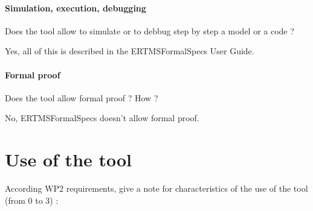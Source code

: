 \paragraph{Simulation, execution, debugging}
Does the tool allow to simulate or to debbug step by step a model or a code ?

\begin{author_comment}
Yes, all of this is described in the ERTMSFormalSpecs User Guide.
\end{author_comment}

\paragraph{Formal proof}
Does the tool allow formal proof ?  How ?

\begin{author_comment}
No, ERTMSFormalSpecs doesn't allow formal proof. 
\end{author_comment}

\section{Use of the tool}


According WP2 requirements, give a note for characteristics of the use of the tool (from 0 to 3) :

